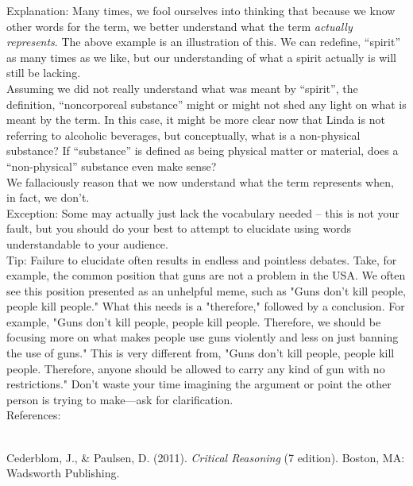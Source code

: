 \documentclass[a4paper,12pt,single,pdftex]{scrbook}
\begin{document}
{    
      Explanation: Many times, we fool ourselves into thinking that because we know other words for the term, we better understand what the term {\it actually represents}.  The above example is an illustration of this.  We can redefine, “spirit” as many times as we like, but our understanding of what a spirit actually is will still be lacking.
    \\

    
      Assuming we did not really understand what was meant by “spirit”, the definition, “noncorporeal substance” might or might not shed any light on what is meant by the term.  In this case, it might be more clear now that Linda is not referring to alcoholic beverages, but conceptually, what is a non-physical substance?  If “substance” is defined as being physical matter or material, does a “non-physical” substance even make sense?
    \\

    
      We fallaciously reason that we now understand what the term represents when, in fact, we don’t.
    \\

    
      Exception: Some may actually just lack the vocabulary needed -- this is not your fault, but you should do your best to attempt to elucidate using words understandable to your audience.
    \\

    
      Tip: Failure to elucidate often results in endless and pointless debates. Take, for example, the common position that guns are not a problem in the USA. We often see this position presented as an unhelpful meme, such as "Guns don't kill people, people kill people." What this needs is a "therefore," followed by a conclusion. For example, "Guns don't kill people, people kill people. Therefore, we should be focusing more on what makes people use guns violently and less on just banning the use of guns." This is very different from, "Guns don't kill people, people kill people. Therefore, anyone should be allowed to carry any kind of gun with no restrictions." Don't waste your time imagining the argument or point the other person is trying to make—ask for clarification.
    \\

    References:

    
      
        
      \\

      
        
          Cederblom, J., \& Paulsen, D. (2011). {\it Critical Reasoning} (7 edition). Boston, MA: Wadsworth Publishing.
        
      
    
  }
\end{document}
